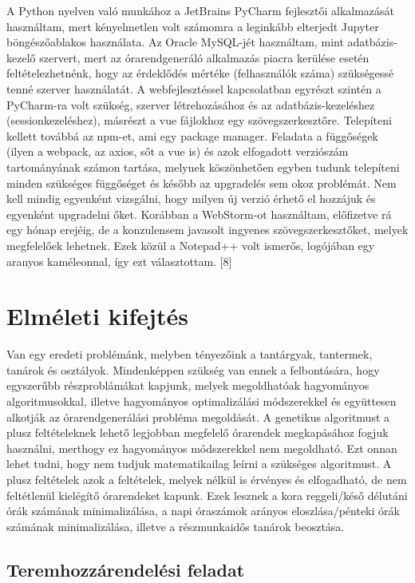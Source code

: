 \documentclass[12pt,a4paper]{report}
\begin{document}
A Python nyelven való munkához a JetBrains PyCharm fejlesztői alkalmazását használtam, mert kényelmetlen volt számomra a leginkább elterjedt Jupyter böngészőablakos használata. Az Oracle MySQL-jét használtam, mint adatbázis-kezelő szervert, mert az órarendgeneráló alkalmazás piacra kerülése esetén feltételezhetnénk, hogy az érdeklődés mértéke (felhasználók száma) szükségessé tenné szerver használatát. A webfejlesztéssel kapcsolatban egyrészt szintén a PyCharm-ra volt szükség, szerver létrehozásához és az adatbázis-kezeléshez (sessionkezeléshez), másrészt a vue fájlokhoz egy szövegszerkesztőre. Telepíteni kellett továbbá az npm-et, ami egy package manager. Feladata a függőségek (ilyen a webpack, az axios, sőt a vue is) és azok elfogadott verziószám tartományának számon tartása, melynek köszönhetően egyben tudunk telepíteni minden szükséges függőséget és később az upgradelés sem okoz problémát. Nem kell mindig egyenként vizsgálni, hogy milyen új verzió érhető el hozzájuk és egyenként upgradelni őket. Korábban a WebStorm-ot használtam, előfizetve rá egy hónap erejéig, de a konzulensem javasolt ingyenes szövegszerkesztőket, melyek megfelelőek lehetnek. Ezek közül a Notepad++ volt ismerős, logójában egy aranyos kaméleonnal, így ezt választottam. [8]

\newpage

\chapter{Elméleti kifejtés}

Van egy eredeti problémánk, melyben tényezőink a tantárgyak, tantermek, tanárok és 
osztályok. Mindenképpen szükség van ennek a felbontására, hogy egyszerűbb részproblámákat kapjunk, melyek megoldhatóak hagyományos algoritmusokkal, illetve hagyományos optimalizálási módszerekkel és együttesen alkotják az órarendgenerálási probléma megoldását. A genetikus algoritmust a plusz feltételeknek lehető legjobban megfelelő órarendek megkapásához fogjuk használni, merthogy ez hagyományos módszerekkel nem megoldható. Ezt onnan lehet tudni, hogy nem tudjuk matematikailag leírni a szükséges algoritmust. A plusz feltételek azok a feltételek, melyek nélkül is érvényes és elfogadható, de nem feltétlenül kielégítő órarendeket kapunk. Ezek lesznek a kora reggeli/késő délutáni órák számának minimalizálása, a napi óraszámok arányos eloszlása/pénteki órák számának minimalizálása, illetve a részmunkaidős tanárok beosztása.

\section{Teremhozzárendelési feladat}
\end{document}
